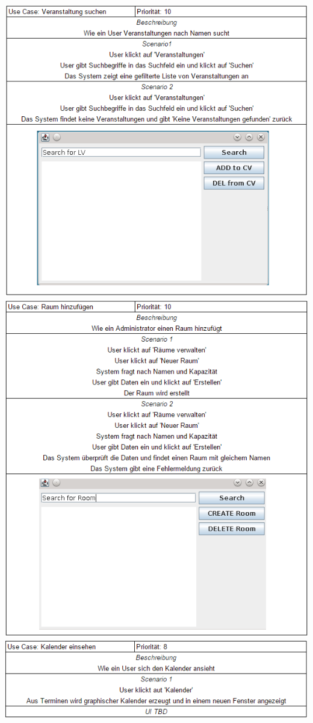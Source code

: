 \documentclass[a4paper,12pt]{article}
\begin{document}
\begin{center}
		\includegraphics[scale=.8]{UCSearchHappening.png}
		\includegraphics[scale=.8]{UCCreateRoom.png}
		\includegraphics[scale=.8]{UCCalendar.png}
	\end{center}
\end{document}
